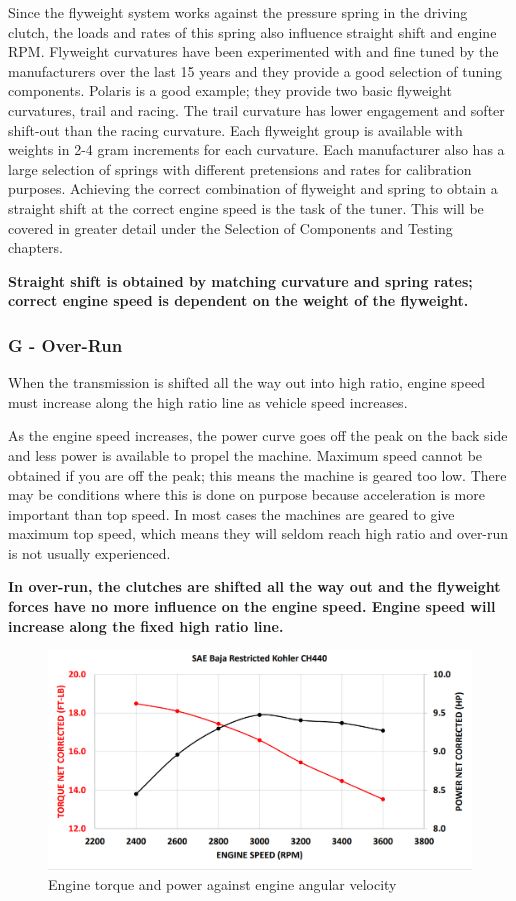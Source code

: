 \documentclass[12pt, titlepage]{article}
\begin{document}
Since the flyweight system works against the pressure spring in the driving clutch, the loads and rates of this spring also influence straight shift and engine RPM. Flyweight curvatures have been experimented with and fine tuned by the manufacturers over the last 15 years and they provide a good selection of tuning components. Polaris is a good example; they provide two basic flyweight curvatures, trail and racing. The trail curvature has lower engagement and softer shift-out than the racing curvature. Each flyweight group is available with weights in 2-4 gram increments for each curvature. Each manufacturer also has a large selection of springs with different pretensions and rates for calibration purposes. Achieving the correct combination of flyweight and spring to obtain a straight shift at the correct engine speed is the task of the tuner. This will be covered in greater detail under the Selection of Components and Testing chapters.

\textbf{Straight shift is obtained by matching curvature and spring rates; correct engine speed is dependent on the weight of the flyweight.}

\subsubsection*{G - Over-Run}

When the transmission is shifted all the way out into high ratio, engine speed must increase along the high ratio line as vehicle speed increases.

As the engine speed increases, the power curve goes off the peak on the back side and less power is available to propel the machine. Maximum speed cannot be obtained if you are off the peak; this means the machine is geared too low. There may be conditions where this is done on purpose because acceleration is more important than top speed. In most cases the machines are geared to give maximum top speed, which means they will seldom reach high ratio and over-run is not usually experienced.

\textbf{In over-run, the clutches are shifted all the way out and the flyweight forces have no more influence on the engine speed. Engine speed will increase along the fixed high ratio line.} \citet{Aaen2007}

\begin{figure}[H]
  \centering
  \includegraphics[width=\textwidth]{graphs/engine.png}
  \caption{Engine torque and power against engine angular velocity \citet{BajaSAEKohlerEngine2022}}
  \label{fig:engine_graph}
\end{figure}
\end{document}
